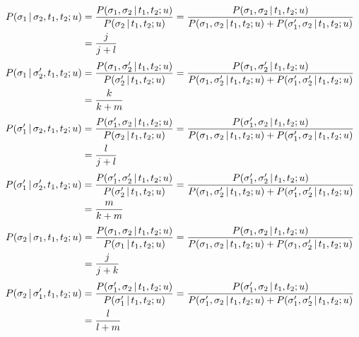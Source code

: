 \begin{align*}P(\sigma_1 \,|\, \sigma_2, t_1, t_2; u)   & = \frac{P(\sigma_1, \sigma_2 \,|\, t_1, t_2; u)}{P(\sigma_2 \,|\, t_1, t_2; u)} = \frac{P(\sigma_1, \sigma_2 \,|\, t_1, t_2; u)}{P(\sigma_1, \sigma_2 \,|\, t_1, t_2; u) + P(\sigma'_1, \sigma_2 \,|\, t_1, t_2; u)}      \\ & = \frac{j}{j + l}\end{align*}
\begin{align*}P(\sigma_1 \,|\, \sigma'_2, t_1, t_2; u)  & = \frac{P(\sigma_1, \sigma'_2 \,|\, t_1, t_2; u)}{P(\sigma'_2 \,|\, t_1, t_2; u)} = \frac{P(\sigma_1, \sigma'_2 \,|\, t_1, t_2; u)}{P(\sigma_1, \sigma'_2 \,|\, t_1, t_2; u) + P(\sigma'_1, \sigma'_2 \,|\, t_1, t_2; u)} \\ & = \frac{k}{k + m}\end{align*}
\begin{align*}P(\sigma'_1 \,|\, \sigma_2, t_1, t_2; u)  & = \frac{P(\sigma'_1, \sigma_2 \,|\, t_1, t_2; u)}{P(\sigma_2 \,|\, t_1, t_2; u)} = \frac{P(\sigma'_1, \sigma_2 \,|\, t_1, t_2; u)}{P(\sigma_1, \sigma_2 \,|\, t_1, t_2; u) + P(\sigma'_1, \sigma_2 \,|\, t_1, t_2; u)}     \\ & =  \frac{l}{j + l}\end{align*}
\begin{align*}P(\sigma'_1 \,|\, \sigma'_2, t_1, t_2; u) & = \frac{P(\sigma'_1, \sigma'_2 \,|\, t_1, t_2; u)}{P(\sigma'_2 \,|\, t_1, t_2; u)} = \frac{P(\sigma'_1, \sigma'_2 \,|\, t_1, t_2; u)}{P(\sigma_1, \sigma'_2 \,|\, t_1, t_2; u) + P(\sigma'_1, \sigma'_2 \,|\, t_1, t_2; u)} \\ & =  \frac{m}{k + m}\end{align*} 
\begin{align*}P(\sigma_2 \,|\, \sigma_1, t_1, t_2; u)   & = \frac{P(\sigma_1, \sigma_2 \,|\, t_1, t_2; u)}{P(\sigma_1 \,|\, t_1, t_2; u)} = \frac{P(\sigma_1, \sigma_2 \,|\, t_1, t_2; u)}{P(\sigma_1, \sigma_2 \,|\, t_1, t_2; u) + P(\sigma_1, \sigma'_2 \,|\, t_1, t_2; u)}        \\ & =  \frac{j}{j + k}\end{align*} 
\begin{align*}P(\sigma_2 \,|\, \sigma'_1, t_1, t_2; u)  & = \frac{P(\sigma'_1, \sigma_2 \,|\, t_1, t_2; u)}{P(\sigma'_1 \,|\, t_1, t_2; u)} = \frac{P(\sigma'_1, \sigma_2 \,|\, t_1, t_2; u)}{P(\sigma'_1, \sigma_2 \,|\, t_1, t_2; u) + P(\sigma'_1, \sigma'_2 \,|\, t_1, t_2; u)}   \\ & =  \frac{l}{l + m}\end{align*} 
